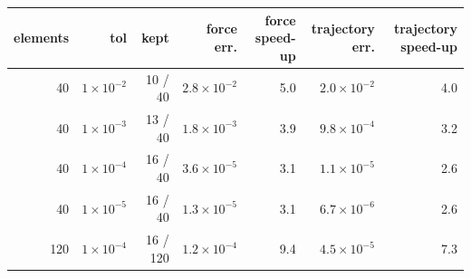 \begin{tabular}{rrrrrrr}
\toprule
elements & tol & kept & force err. & force speed-up & trajectory err. & trajectory speed-up \\
\midrule
40 & $1\times10^{-2}$ & 10 / 40 & $2.8\times10^{-2}$ & 5.0 & $2.0\times10^{-2}$ & 4.0 \\
40 & $1\times10^{-3}$ & 13 / 40 & $1.8\times10^{-3}$ & 3.9 & $9.8\times10^{-4}$ & 3.2 \\
40 & $1\times10^{-4}$ & 16 / 40 & $3.6\times10^{-5}$ & 3.1 & $1.1\times10^{-5}$ & 2.6 \\
40 & $1\times10^{-5}$ & 16 / 40 & $1.3\times10^{-5}$ & 3.1 & $6.7\times10^{-6}$ & 2.6 \\
120 & $1\times10^{-4}$ & 16 / 120 & $1.2\times10^{-4}$ & 9.4 & $4.5\times10^{-5}$ & 7.3 \\
\bottomrule
\end{tabular}

